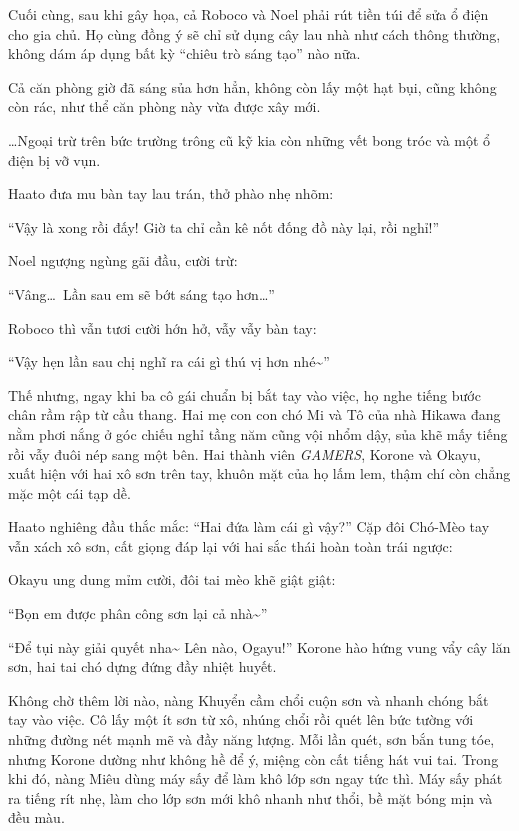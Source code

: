 \documentclass[../main.tex]{subfiles}
\begin{document}
\ct

Cuối cùng, sau khi gây họa, cả Roboco và Noel phải rút tiền túi để sửa ổ điện cho gia chủ. Họ cùng đồng ý sẽ chỉ sử dụng cây lau nhà như cách thông thường, không dám áp dụng bất kỳ ``chiêu trò sáng tạo'' nào nữa.

Cả căn phòng giờ đã sáng sủa hơn hẳn, không còn lấy một hạt bụi, cũng không còn rác, như thể căn phòng này vừa được xây mới.

\dots Ngoại trừ trên bức trường trông cũ kỹ kia còn những vết bong tróc và một ổ điện bị vỡ vụn.

Haato đưa mu bàn tay lau trán, thở phào nhẹ nhõm:

``Vậy là xong rồi đấy! Giờ ta chỉ cần kê nốt đống đồ này lại, rồi nghỉ!''

Noel ngượng ngùng gãi đầu, cười trừ:

``Vâng\dots\ Lần sau em sẽ bớt sáng tạo hơn\dots''

Roboco thì vẫn tươi cười hớn hở, vẫy vẫy bàn tay:

``Vậy hẹn lần sau chị nghĩ ra cái gì thú vị hơn nhé\~{}''

Thế nhưng, ngay khi ba cô gái chuẩn bị bắt tay vào việc, họ nghe tiếng bước chân rầm rập từ cầu thang. Hai mẹ con con chó Mi và Tô của nhà Hikawa đang nằm phơi nắng ở góc chiếu nghỉ tầng năm cũng vội nhổm dậy, sủa khẽ mấy tiếng rồi vẫy đuôi nép sang một bên. Hai thành viên \textit{GAMERS}, Korone và Okayu, xuất hiện với hai xô sơn trên tay, khuôn mặt của họ lấm lem, thậm chí còn chẳng mặc một cái tạp dề.

Haato nghiêng đầu thắc mắc: ``Hai đứa làm cái gì vậy?'' Cặp đôi Chó-Mèo tay vẫn xách xô sơn, cất giọng đáp lại với hai sắc thái hoàn toàn trái ngược:

Okayu ung dung mỉm cười, đôi tai mèo khẽ giật giật:

``Bọn em được phân công sơn lại cả nhà\~{}''

``Để tụi này giải quyết nha\~{} Lên nào, Ogayu!'' Korone hào hứng vung vẩy cây lăn sơn, hai tai chó dựng đứng đầy nhiệt huyết.

Không chờ thêm lời nào, nàng Khuyển cầm chổi cuộn sơn và nhanh chóng bắt tay vào việc. Cô lấy một ít sơn từ xô, nhúng chổi rồi quét lên bức tường với những đường nét mạnh mẽ và đầy năng lượng. Mỗi lần quét, sơn bắn tung tóe, nhưng Korone dường như không hề để ý, miệng còn cất tiếng hát vui tai. Trong khi đó, nàng Miêu dùng máy sấy để làm khô lớp sơn ngay tức thì. Máy sấy phát ra tiếng rít nhẹ, làm cho lớp sơn mới khô nhanh như thổi, bề mặt bóng mịn và đều màu.
\end{document}
